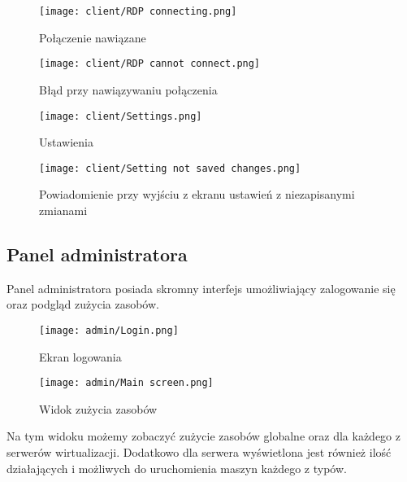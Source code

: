 \documentclass[../../deliverable-two.tex]{subfiles}
\begin{document}
\begin{figure}[H]
  \centering\texttt{[image: client/RDP connecting.png]}
  \caption{Połączenie nawiązane}
\end{figure}

\begin{figure}[H]
  \centering\texttt{[image: client/RDP cannot connect.png]}
  \caption{Błąd przy nawiązywaniu połączenia}
\end{figure}

\begin{figure}[H]
  \centering\texttt{[image: client/Settings.png]}
  \caption{Ustawienia}
\end{figure}

\begin{figure}[H]
  \centering\texttt{[image: client/Setting not saved changes.png]}
  \caption{Powiadomienie przy wyjściu z ekranu ustawień z niezapisanymi zmianami}
\end{figure}

\pagebreak

\subsection{Panel administratora}

Panel administratora posiada skromny interfejs umożliwiający zalogowanie się oraz podgląd zużycia zasobów.

\begin{figure}[H]
  \centering\texttt{[image: admin/Login.png]}
  \caption{Ekran logowania}
\end{figure}

\begin{figure}[H]
  \centering\texttt{[image: admin/Main screen.png]}
  \caption{Widok zużycia zasobów}
\end{figure}

Na tym widoku możemy zobaczyć zużycie zasobów globalne oraz dla każdego z serwerów wirtualizacji. Dodatkowo dla serwera wyświetlona jest również ilość działających i możliwych do uruchomienia maszyn każdego z typów.
\end{document}
